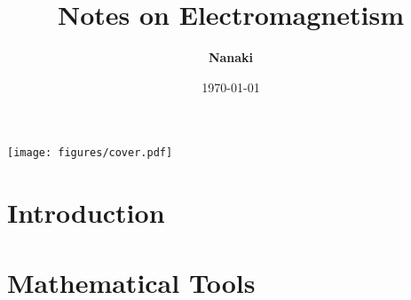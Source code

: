 \documentclass[
    ebook,
    11pt,
    twoside,
    onecolumn,
    openright,
    final
]{memoir}
\begin{document}
\begin{titlingpage}
    \title{\HUGE\textbf{Notes on Electromagnetism}}
    \author{\Large\textbf{Nanaki}}
    \date{\Large{\today}}

    \maketitle
    \texttt{[image: figures/cover.pdf]}
\end{titlingpage}

\frontmatter

\tableofcontents

\mainmatter

\chapter{Introduction}

\appendix

\chapter{Mathematical Tools}

\backmatter
\end{document}
